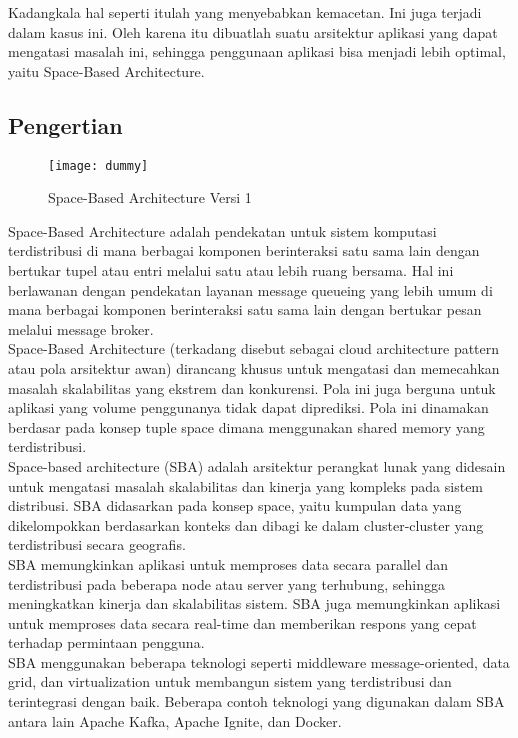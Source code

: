 	Kadangkala hal seperti itulah yang menyebabkan kemacetan. Ini juga terjadi dalam kasus ini. Oleh karena itu dibuatlah suatu arsitektur aplikasi yang dapat mengatasi masalah ini, sehingga penggunaan aplikasi bisa menjadi lebih optimal, yaitu Space-Based Architecture.
	\vskip0.5cm
	\subsection*{\LARGE{Pengertian}}
	\begin{figure}
		\centering
		\texttt{[image: dummy]}
		\caption{Space-Based Architecture Versi 1}
	\end{figure}
	\large Space-Based Architecture adalah pendekatan untuk sistem komputasi terdistribusi di mana berbagai komponen berinteraksi satu sama lain dengan bertukar tupel atau entri melalui satu atau lebih ruang bersama. Hal ini berlawanan dengan pendekatan layanan message queueing yang lebih umum di mana berbagai komponen berinteraksi satu sama lain dengan bertukar pesan melalui message broker.\\
	
	Space-Based Architecture (terkadang disebut sebagai cloud architecture pattern atau pola arsitektur awan) dirancang khusus untuk mengatasi dan memecahkan masalah skalabilitas yang ekstrem dan konkurensi. Pola ini juga berguna untuk aplikasi yang volume penggunanya tidak dapat diprediksi. Pola ini dinamakan berdasar pada konsep tuple space dimana menggunakan shared memory yang terdistribusi.\\
	
	Space-based architecture (SBA) adalah arsitektur perangkat lunak yang didesain untuk mengatasi masalah skalabilitas dan kinerja yang kompleks pada sistem distribusi. SBA didasarkan pada konsep space, yaitu kumpulan data yang dikelompokkan berdasarkan konteks dan dibagi ke dalam cluster-cluster yang terdistribusi secara geografis.\\
	
	SBA memungkinkan aplikasi untuk memproses data secara parallel dan terdistribusi pada beberapa node atau server yang terhubung, sehingga meningkatkan kinerja dan skalabilitas sistem. SBA juga memungkinkan aplikasi untuk memproses data secara real-time dan memberikan respons yang cepat terhadap permintaan pengguna.\\
	
	SBA menggunakan beberapa teknologi seperti middleware message-oriented, data grid, dan virtualization untuk membangun sistem yang terdistribusi dan terintegrasi dengan baik. Beberapa contoh teknologi yang digunakan dalam SBA antara lain Apache Kafka, Apache Ignite, dan Docker.\\
	
